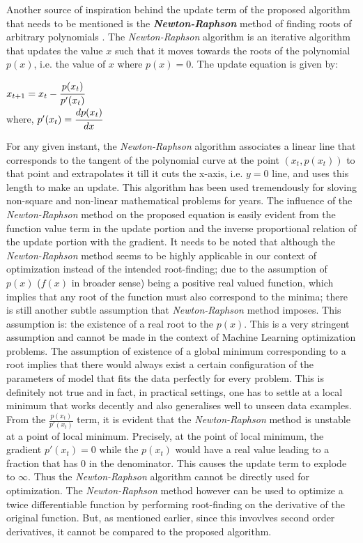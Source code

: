 \documentclass{article}
\begin{document}
Another source of inspiration behind the update term of the proposed algorithm that needs to be mentioned is the \textbf{\textit{Newton-Raphson}} method of finding roots of arbitrary polynomials \cite{akram:newton-raphson}. The \textit{Newton-Raphson} algorithm is an iterative algorithm that updates the value $x$ such that it moves towards the roots of the polynomial $p(x)$, i.e. the value of $x$ where $p(x) = 0$. The update equation is given by:

\begin{center}
	$x_{t + 1} = x_{t} - \cfrac{p(x_{t})}{p'(x_{t})}$\\
	where, $p'(x_{t}) = \cfrac{dp(x_{t})}{dx}$
\end{center}

For any given instant, the \textit{Newton-Raphson} algorithm associates a linear line that corresponds to the tangent of the polynomial curve at the point $(x_t, p(x_t))$ to that point and extrapolates it till it cuts the x-axis, i.e. $y = 0$ line, and uses this length to make an update. This algorithm has been used tremendously for sloving non-square and non-linear mathematical problems for years. The influence of the \textit{Newton-Raphson} method on the proposed equation is easily evident from the function value term in the update portion and the inverse proportional relation of the update portion with the gradient. It needs to be noted that although the \textit{Newton-Raphson} method seems to be highly applicable in our context of optimization instead of the intended root-finding; due to the assumption of $p(x)$ ($f(x)$ in broader sense) being a positive real valued function, which implies that any root of the function must also correspond to the minima; there is still another subtle assumption that \textit{Newton-Raphson} method imposes. This assumption is: the existence of a real root to the $p(x)$. This is a very stringent assumption and cannot be made in the context of Machine Learning optimization problems. The assumption of existence of a global minimum corresponding to a root implies that there would always exist a certain configuration of the parameters of model that fits the data perfectly for every problem. This is definitely not true and in fact, in practical settings, one has to settle at a local minimum that works decently and also generalises well to unseen data examples. From the $\frac{p(x_t)}{p'(x_t)}$ term, it is evident that the \textit{Newton-Raphson} method is unstable at a point of local minimum. Precisely, at the point of local minimum, the gradient $p'(x_t) = 0$ while the $p(x_t)$ would have a real value leading to a fraction that has $0$ in the denominator. This causes the update term to explode to $\infty$. Thus the \textit{Newton-Raphson} algorithm cannot be directly used for optimization. The \textit{Newton-Raphson} method however can be used to optimize a twice differentiable function by performing root-finding on the derivative of the original function. But, as mentioned earlier, since this invovlves second order derivatives, it cannot be compared to the proposed algorithm.
\end{document}
